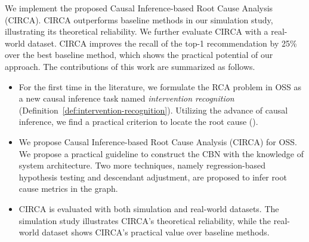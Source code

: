 We implement the proposed Causal Inference-based Root Cause Analysis (CIRCA).
CIRCA outperforms baseline methods in our simulation study, illustrating its theoretical reliability.
We further evaluate CIRCA with a real-world dataset.
CIRCA improves the recall of the top-1 recommendation by 25\% over the best baseline method, which shows the practical potential of our approach.
The contributions of this work are summarized as follows.

\begin{itemize}
	\item For the first time in the literature, we formulate the RCA problem in OSS as a new causal inference task named \textit{intervention recognition} (Definition~\ref{def:intervention-recognition}).
	Utilizing the advance of causal inference, we find a practical criterion to locate the root cause ().
	\item We propose Causal Inference-based Root Cause Analysis (CIRCA) for OSS.
	We propose a practical guideline to construct the CBN with the knowledge of system architecture.
	Two more techniques, namely regression-based hypothesis testing and descendant adjustment, are proposed to infer root cause metrics in the graph.
	\item CIRCA is evaluated with both simulation and real-world datasets.
	The simulation study illustrates CIRCA's theoretical reliability, while the real-world dataset shows CIRCA's practical value over baseline methods.
\end{itemize}

